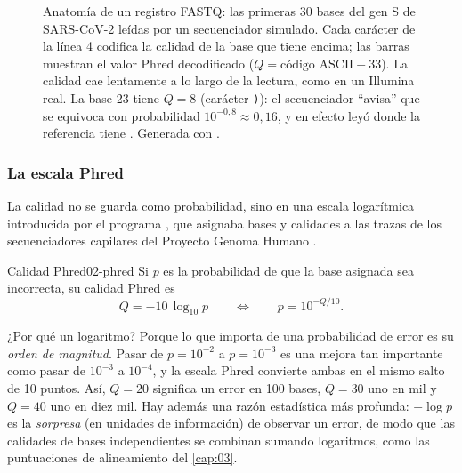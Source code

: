 \begin{figure}[t]
\centering

\caption[Anatomía de un registro FASTQ]{Anatomía de un registro FASTQ: las primeras 30 bases del gen S de SARS-CoV-2 leídas por un secuenciador simulado. Cada carácter de la línea 4 codifica la calidad de la base que tiene encima; las barras muestran el valor Phred decodificado ($Q=\text{código ASCII}-33$). La calidad cae lentamente a lo largo de la lectura, como en un Illumina real. La base 23 tiene $Q=8$ (carácter \texttt{)}): el secuenciador ``avisa'' que se equivoca con probabilidad $10^{-0{,}8}\approx0{,}16$, y en efecto leyó  donde la referencia tiene . Generada con .}
\label{fig:02-fastq}
\end{figure}

\subsubsection{La escala Phred}

La calidad no se guarda como probabilidad, sino en una escala logarítmica introducida por el programa , que asignaba bases y calidades a las trazas de los secuenciadores capilares del Proyecto Genoma Humano \parencite{c02-ewing1998a,c02-ewing1998b}.

\begin{definicion}{Calidad Phred}{02-phred}
Si $p$ es la probabilidad de que la base asignada sea incorrecta, su calidad Phred es
\begin{equation}\label{eq:02-phred}
Q = -10\,\log_{10} p \qquad\Longleftrightarrow\qquad p = 10^{-Q/10}.
\end{equation}
\end{definicion}
\begin{simbolos}
\end{simbolos}

¿Por qué un logaritmo? Porque lo que importa de una probabilidad de error es su \emph{orden de magnitud}. Pasar de $p=10^{-2}$ a $p=10^{-3}$ es una mejora tan importante como pasar de $10^{-3}$ a $10^{-4}$, y la escala Phred convierte ambas en el mismo salto de 10 puntos. Así, $Q=20$ significa un error en 100 bases, $Q=30$ uno en mil y $Q=40$ uno en diez mil. Hay además una razón estadística más profunda: $-\log p$ es la \emph{sorpresa} (en unidades de información) de observar un error, de modo que las calidades de bases independientes se combinan sumando logaritmos, como las puntuaciones de alineamiento del \cref{cap:03}.

